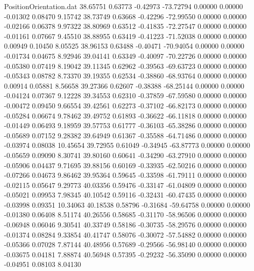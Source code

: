 \begin{filecontents}{PositionOrientation.dat}
  38.65751    0.63773   -0.42973   -73.72794    0.00000    0.00000   -0.01302    0.08470    9.15742
  38.73749    0.63668   -0.42296   -72.99550    0.00000    0.00000   -0.02166    0.06378    9.97322
  38.80969    0.63512   -0.41835   -72.27547    0.00000    0.00000   -0.01161    0.07667    9.45510
  38.88955    0.63419   -0.41223   -71.52038    0.00000    0.00000    0.00949    0.10450    8.05525
  38.96153    0.63488   -0.40471   -70.94054    0.00000    0.00000   -0.01734    0.04675    8.92946
  39.04141    0.63349   -0.40097   -70.22726    0.00000    0.00000   -0.05380    0.07419    8.19042
  39.11345    0.62962   -0.39563   -69.63723    0.00000    0.00000   -0.05343    0.08782    8.73370
  39.19355    0.62534   -0.38860   -68.93764    0.00000    0.00000    0.00914    0.05881    8.56658
  39.27366    0.62607   -0.38388   -68.25144    0.00000    0.00000   -0.04124    0.07367    9.12228
  39.34553    0.62310   -0.37859   -67.59580    0.00000    0.00000   -0.00472    0.09450    9.66554
  39.42561    0.62273   -0.37102   -66.82173    0.00000    0.00000   -0.05284    0.06674    9.78462
  39.49752    0.61893   -0.36622   -66.11818    0.00000    0.00000   -0.01449    0.06493    9.18959
  39.57753    0.61777   -0.36103   -65.38286    0.00000    0.00000   -0.05689    0.07152    9.28382
  39.64949    0.61367   -0.35588   -64.71486    0.00000    0.00000   -0.03974    0.08038   10.45654
  39.72955    0.61049   -0.34945   -63.87773    0.00000    0.00000   -0.05659    0.09090    8.30741
  39.80160    0.60641   -0.34290   -63.27910    0.00000    0.00000   -0.05906    0.04437    9.71695
  39.88156    0.60169   -0.33935   -62.50216    0.00000    0.00000   -0.07266    0.04673    9.86462
  39.95364    0.59645   -0.33598   -61.79111    0.00000    0.00000   -0.02115    0.05647    9.29773
  40.03356    0.59476   -0.33147   -61.04809    0.00000    0.00000   -0.05021    0.09953    7.98345
  40.10542    0.59116   -0.32431   -60.47435    0.00000    0.00000   -0.03998    0.09351   10.34063
  40.18538    0.58796   -0.31684   -59.64758    0.00000    0.00000   -0.01380    0.06408    8.51174
  40.26556    0.58685   -0.31170   -58.96506    0.00000    0.00000   -0.06948    0.06046    9.30541
  40.33749    0.58186   -0.30735   -58.29576    0.00000    0.00000   -0.01374    0.08284    9.33854
  40.41747    0.58076   -0.30072   -57.54882    0.00000    0.00000   -0.05366    0.07028    7.87144
  40.48956    0.57689   -0.29566   -56.98140    0.00000    0.00000   -0.03675    0.04181    7.88874
  40.56948    0.57395   -0.29232   -56.35090    0.00000    0.00000   -0.04951    0.08103    8.04130

\end{filecontents}
